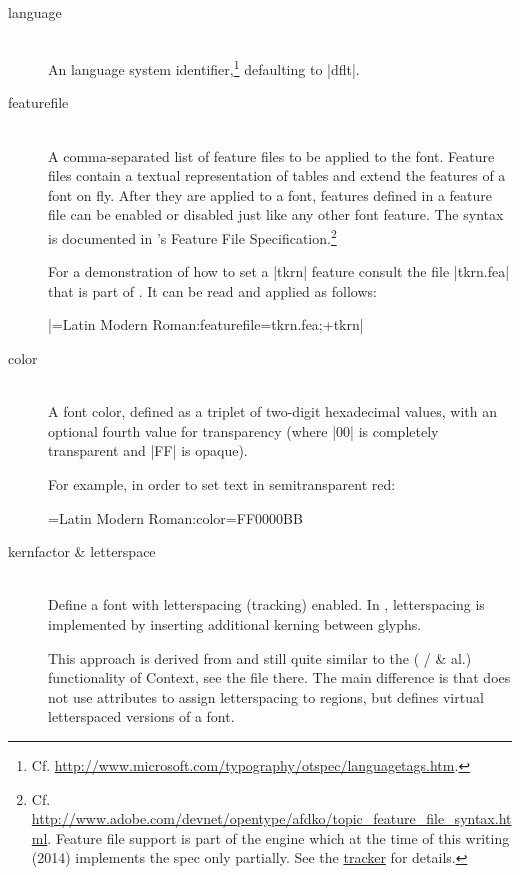\begin{description}
\item [language] \hfill \\
       An \OpenType language system identifier,\footnote{%
         Cf. \url{http://www.microsoft.com/typography/otspec/languagetags.htm}.
       }
       defaulting to |dflt|.

\item [featurefile] \hfill \\
       A comma-separated list of feature files to be applied to the
       font.
       Feature files contain a textual representation of
       \OpenType tables and extend the features of a font
       on fly.
       After they are applied to a font, features defined in a
       feature file can be enabled or disabled just like any
       other font feature.
       The syntax is documented in ’s
       \OpenType Feature File Specification.\footnote{%
         Cf. \url{http://www.adobe.com/devnet/opentype/afdko/topic_feature_file_syntax.html}.
				 Feature file support is part of the engine which at the
				 time of this writing (2014) implements the spec only
				 partially.
				 See the
				 \href{http://tracker.luatex.org/view.php?id=231}
              {\LUATEX tracker}
					for details.
       }

       For a demonstration of how to set a |tkrn| feature consult
       the file |tkrn.fea| that is part of .
       It can be read and applied as follows:

       |\font\test=Latin Modern Roman:featurefile=tkrn.fea;+tkrn|

\item [color] \hfill \\
       A font color, defined as a triplet of two-digit hexadecimal
        values, with an optional fourth value for
       transparency
       (where |00| is completely transparent and |FF| is opaque).

       For example, in order to set text in semitransparent red:

			 \beginlisting
 \font\test={Latin Modern Roman}:color=FF0000BB
			 \endlisting

\item [kernfactor \& letterspace] \hfill \\
       Define a font with letterspacing (tracking) enabled.
       In , letterspacing is implemented by
       inserting additional kerning between glyphs.

       This approach is derived from and still quite similar to the
        ( /
        \& al.) functionality of
       Context, see the file  there.
       The main difference is that  does not
       use \LUATEX attributes to assign letterspacing to regions,
       but defines virtual letterspaced versions of a font.


\end{description}
